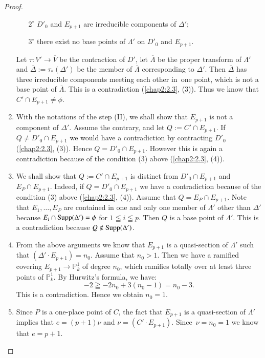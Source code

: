 \begin{proof}
\begin{enumerate}
\begin{itemize}
\item[$2^{\circ}$] $D'_{0}$ and $E_{p+1}$ are irreducible components
  of $\Delta'$;

\item[$3^{\circ}$] there exist no base points of $\Lambda'$ on $D'_{0}$ and $E_{p+1}$.
\end{itemize}
Let $\tau:V'\to \overline{V}$ be the contraction of $D'$, let
$\overline{\Lambda}$ be the proper transform of $\Lambda'$ and
$\overline{\Delta}:=\tau_{\ast}(\Delta')$ be the member of
$\overline{\Lambda}$ corresponding to $\Delta'$. Then
$\overline{\Delta}$ has three irreducible components meeting each
other in\pageoriginale\ one point, which is not a base point of
$\overline{\Lambda}$. This is a contradiction (\cf \ref{chap2:2.3},
(3)). Thus we know that $C'\cap E_{p+1}\neq \phi$.

\item With the notations of the step (II), we shall show that
  $E_{p+1}$ is not a component of $\Delta'$. Assume the contrary, and
  let $Q:=C'\cap E_{p+1}$. If $Q\neq D'_{0}\cap E_{p+1}$ we would have
  a contradiction by contracting $D'_{0}$ (\cf \ref{chap2:2.3}, (3)). Hence
  $Q=D'_{0}\cap E_{p+1}$. However this is again a contradiction
  because of the condition (3) above (\cf \ref{chap2:2.3}, (4)).

\item We shall show that $Q:=C'\cap E_{p+1}$ is distinct from
  $D'_{0}\cap E_{p+1}$ and $E_{P}\cap E_{p+1}$. Indeed, if
  $Q=D'_{0}\cap E_{p+1}$ we have a contradiction because of the
  condition (3) above (\cf \ref{chap2:2.3}, (4)). Assume that $Q=E_{P}\cap
  E_{p+1}$. Note that $E_{1},\ldots,E_{P}$ are contained in one and
  only one member of $\Lambda'$ other than $\Delta'$ because
  $E_{i}\cap \operatorname{Supp}(\Delta')=\phi$ for $1\leqq i\leqq p$. Then $Q$ is a
  base point of $\Lambda'$. This is a contradiction because $Q\not\in
  \operatorname{Supp} (\Delta')$.

\item From the above arguments we know that $E_{p+1}$ is a
  quasi-section of $\Lambda'$ such that
  $(\Delta'\cdot E_{p+1})=n_{0}$. Assume that $n_{0}>1$. Then we have a
  ramified covering $E_{p+1}\to \mathbb{P}^{1}_{k}$ of degree $n_{0}$,
  which ramifies totally over at least three points of
  $\mathbb{P}^{1}_{k}$. By Hurwitz's formula, we have:
$$
-2\geqq -2n_{0}+3(n_{0}-1)=n_{0}-3.
$$
This is a contradiction. Hence we obtain $n_{0}=1$.

\item Since $P$ is a one-place point of $C$, the fact that $E_{p+1}$
  is a quasi-section of $\Lambda'$ implies that $e=(p+1)\nu$ and
  $\nu=(C'\cdot E_{p+1})$. Since\pageoriginale\ $\nu=n_{0}=1$ we know
  that $e=p+1$.
\end{enumerate}
\end{proof}

